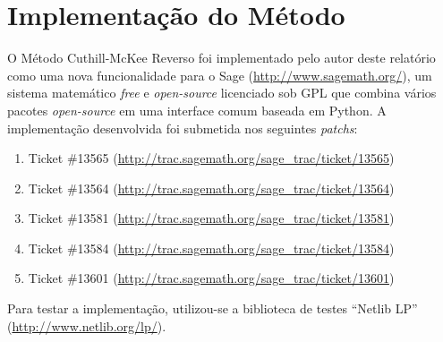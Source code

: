 \section{Implementação do Método}
O Método Cuthill-McKee Reverso foi implementado pelo autor deste relatório como
uma nova funcionalidade para o Sage (\url{http://www.sagemath.org/}), um
sistema matemático \textit{free} e \textit{open-source} licenciado sob GPL que
combina vários pacotes \textit{open-source} em uma interface comum baseada em
Python. A implementação desenvolvida foi submetida nos seguintes
\textit{patchs}:
\begin{enumerate}
    \item Ticket \#13565
        (\url{http://trac.sagemath.org/sage_trac/ticket/13565})
    \item Ticket \#13564
        (\url{http://trac.sagemath.org/sage_trac/ticket/13564})
    \item Ticket \#13581
        (\url{http://trac.sagemath.org/sage_trac/ticket/13581})
    \item Ticket \#13584
        (\url{http://trac.sagemath.org/sage_trac/ticket/13584})
    \item Ticket \#13601
        (\url{http://trac.sagemath.org/sage_trac/ticket/13601})
\end{enumerate}

Para testar a implementação, utilizou-se a biblioteca de testes ``Netlib LP''
(\url{http://www.netlib.org/lp/}).
